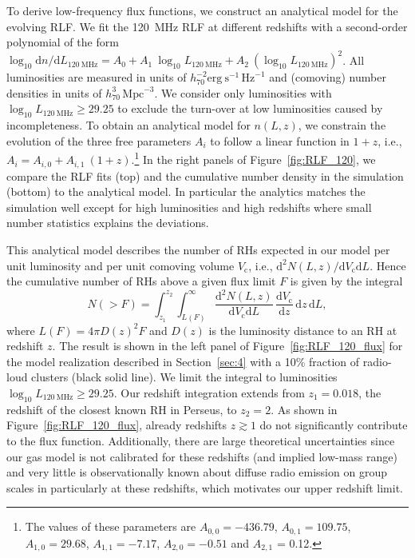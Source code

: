 \documentclass[traditabstract]{aa}
\newcommand{\rmn}{\mathrm}
\begin{document}
To derive low-frequency flux functions, we construct an analytical model for the
evolving RLF. We fit the 120~MHz RLF at different redshifts with a second-order
polynomial of the form $\log_{10} \rmn{d}n/\rmn{d}L_{120~\rmn{MHz}} = A_{0} +
A_{1}~\log_{10} L_{120~\rmn{MHz}} + A_{2}~(\log_{10} L_{120~\rmn{MHz}})^{2}$.
All luminosities are measured in units of $h_{70}^{-2}
\rmn{erg~s}^{-1}\,\rmn{Hz}^{-1}$ and (comoving) number densities in units of
$h_{70}^{3}\,\rmn{Mpc}^{-3}$. We consider only luminosities with $\log_{10}
L_{120~\rmn{MHz}} \geq 29.25$ to exclude the turn-over at low luminosities
caused by incompleteness. To obtain an analytical model for $n(L,z)$, we
constrain the evolution of the three free parameters $A_i$ to follow a linear
function in $1+z$, i.e., $A_{i} = A_{i,0} + A_{i,1}~(1+z)$.\footnote{The values
  of these parameters are $A_{0,0} = -436.79$, $A_{0,1} = 109.75$, $A_{1,0} =
  29.68$, $A_{1,1} = -7.17$, $A_{2,0} = -0.51$ and $A_{2,1}$ = 0.12.} In the
right panels of Figure~\ref{fig:RLF_120}, we compare the RLF fits (top) and the
cumulative number density in the simulation (bottom) to the analytical model. In
particular the analytics matches the simulation well except for high
luminosities and high redshifts where small number statistics explains the
deviations.

This analytical model describes the number of RHs expected in our model per unit
luminosity and per unit comoving volume $V_{\rmn{c}}$, i.e., $\rmn{d}^2N(L,z)
/\rmn{d}V_{\rmn{c}}\rmn{d}L$. Hence the cumulative number of RHs above a given flux
limit $F$ is given by the integral
\begin{equation}
N(>F)  =  \int_{z_1}^{z_2} \int_{L(F)}^{\infty} 
\frac{\rmn{d}^2N(L,z)}{\rmn{d}V_{\rmn{c}}\rmn{d}L}\,
\frac{\rmn{d}V_{\rmn{c}}}{\rmn{d}z}\, \rmn{d}z\, \rmn{d}L ,
\label{eq:NtotRH}
\end{equation}
where $L(F) = 4 \pi D(z)^2 F$ and $D(z)$ is the luminosity distance to an RH at
redshift $z$.  The result is shown in the left panel of
Figure~\ref{fig:RLF_120_flux} for the model realization described in
Section~\ref{sec:4} with a 10\% fraction of radio-loud clusters (black solid
line). We limit the integral to luminosities $\log_{10} L_{120~\rmn{MHz}}
\geq 29.25$. Our redshift integration extends from $z_{1} = 0.018$, the redshift
of the closest known RH in Perseus, to $z_{2} = 2$. As shown in
Figure~\ref{fig:RLF_120_flux}, already redshifts $z\gtrsim1$ do not
significantly contribute to the flux function. Additionally, there are large
theoretical uncertainties since our gas model is not calibrated for these
redshifts (and implied low-mass range) and very little is observationally known
about diffuse radio emission on group scales in particularly at these redshifts,
which motivates our upper redshift limit.
\end{document}
